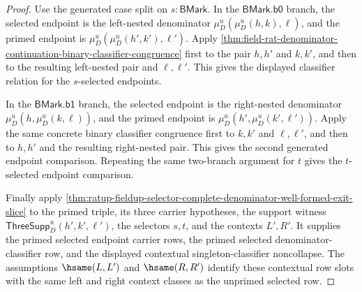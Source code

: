 \begin{proof}
Use the generated case split on $s:\mathsf{BMark}$. In the
$\mathsf{BMark.b0}$ branch, the selected endpoint is the left-nested
denominator $\mu_D^u(\mu_D^u(h,k),\ell)$, and the primed endpoint is
$\mu_D^u(\mu_D^u(h',k'),\ell')$. Apply
\autoref{thm:field-rat-denominator-continuation-binary-classifier-congruence}
first to the pair $h,h'$ and $k,k'$, and then to the resulting left-nested
pair and $\ell,\ell'$. This gives the displayed classifier relation for the
$s$-selected endpoints.

In the $\mathsf{BMark.b1}$ branch, the selected endpoint is the right-nested
denominator $\mu_D^u(h,\mu_D^u(k,\ell))$, and the primed endpoint is
$\mu_D^u(h',\mu_D^u(k',\ell'))$. Apply the same concrete binary classifier
congruence first to $k,k'$ and $\ell,\ell'$, and then to $h,h'$ and the
resulting right-nested pair. This gives the second generated endpoint
comparison. Repeating the same two-branch argument for $t$ gives the
$t$-selected endpoint comparison.

Finally apply
\autoref{thm:ratup-fieldup-selector-complete-denominator-well-formed-exit-slice}
to the primed triple, its three carrier hypotheses, the support witness
$\mathsf{ThreeSupp}_D^u(h',k',\ell')$, the selectors $s,t$, and the contexts
$L',R'$. It supplies the primed selected endpoint carrier rows, the primed
selected denominator-classifier row, and the displayed contextual
singleton-classifier noncollapse. The assumptions $\hsame(L,L')$ and
$\hsame(R,R')$ identify these contextual row slots with the same left and right
context classes as the unprimed selected row.
\end{proof}


